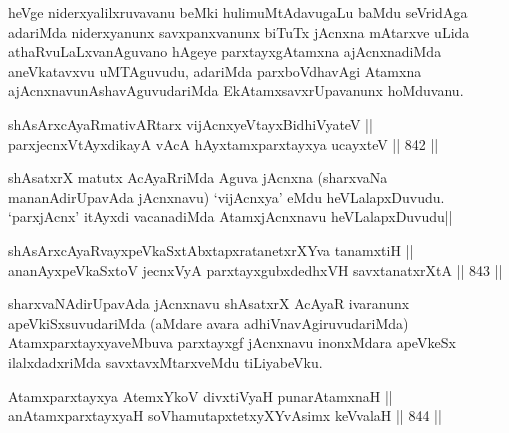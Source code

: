 \begin{artha}
heVge niderxyalilxruvavanu beMki hulimuMtAdavugaLu baMdu seVridAga adariMda niderxyanunx savxpanxvanunx biTuTx jAcnxna mAtarxve uLida athaRvuLaLxvanAguvano hAgeye parxtayxgAtamxna ajAcnxnadiMda aneVkatavxvu uMTAguvudu, adariMda parxboVdhavAgi Atamxna ajAcnxnavunAshavAguvudariMda EkAtamxsavxrUpavanunx hoMduvanu.
\end{artha}


\begin{shl}
shAsArxcAyaRmativAR\s tarx vijAcnxyeVtayxBidhiVyateV || \\
parxjecnxVtAyxdikayA vAcA hAyxtamxparxtayxya ucayxteV \hfill || 842 ||  
\end{shl}

\begin{artha}
shAsatxrX matutx AcAyaRriMda Aguva jAcnxna (sharxvaNa mananAdirUpavAda jAcnxnavu) `vijAcnxya' eMdu heVLalapxDuvudu. `parxjAcnx' itAyxdi vacanadiMda AtamxjAcnxnavu heVLalapxDuvudu||
\end{artha}


\begin{shl}
shAsArxcAyaRvayxpeVkaSxtAbxtapxratanetxrXYva tanamxtiH || \\
ananAyxpeVkaSxtoV jecnxVyA parxtayxgubxdedhxVH savxtanatxrXtA \hfill || 843 ||  
\end{shl}

\begin{artha}
sharxvaNAdirUpavAda jAcnxnavu shAsatxrX AcAyaR ivaranunx apeVkiSxsuvudariMda (aMdare avara adhiVnavAgiruvudariMda) AtamxparxtayxyaveMbuva parxtayxgf jAcnxnavu inonxMdara apeVkeSx ilalxdadxriMda savxtavxMtarxveMdu tiLiyabeVku.
\end{artha}

\begin{shl}
Atamxparxtayxya AtemxYkoV divxtiVyaH punarAtamxnaH || \\
anAtamxparxtayxyaH soV\s hamutapxtetxyXYvAsimx keVvalaH \hfill || 844 ||  
\end{shl}

